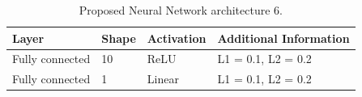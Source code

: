 \documentclass[12pt]{IEEEtran}%
\begin{document}
\begin{table}[tbh]
\centering
\caption{Proposed Neural Network architecture 6.}%
\begin{tabular}
[c]{llll}\hline
Layer & Shape & Activation & Additional Information\\\hline\hline
Fully connected & 10 & ReLU & L1 = 0.1, L2 = 0.2\\
Fully connected & 1 & Linear & L1 = 0.1, L2 = 0.2\\\hline
\end{tabular}
\label{table:proposed_nn_6}%
\end{table}
\end{document}
